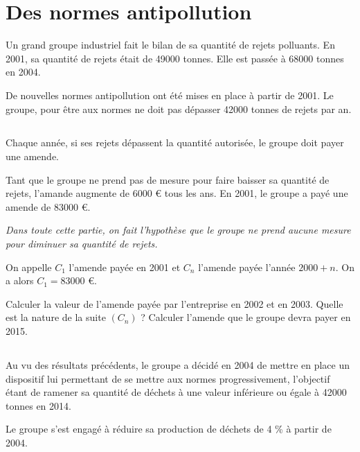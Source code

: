 \section{Des normes antipollution}

Un grand groupe industriel fait le bilan de sa quantité de rejets polluants. En 2001, sa quantité de rejets était de \num{49000} tonnes. Elle est passée à \num{68000} tonnes en 2004.

De nouvelles normes antipollution ont été mises en place à partir de 2001. Le groupe, pour être aux normes ne doit pas dépasser \num{42000} tonnes de rejets par an.

\subsection{}
Chaque année, si ses rejets dépassent la quantité autorisée, le groupe doit payer une amende.

Tant que le groupe ne prend pas de mesure pour faire baisser sa quantité de rejets, l'amande augmente de \num{6000} € tous les ans. En 2001, le groupe a payé une amende de \num{83000} €.

\textit{Dans toute cette partie, on fait l'hypothèse que le groupe ne prend aucune mesure pour diminuer sa quantité de rejets.}

On appelle $C_1$ l'amende payée en 2001 et $C_n$ l'amende payée l'année $2000 + n$. On a alors $C_1 = \num{83000}$ €.

\begin{questions}
	\question Calculer la valeur de l'amende payée par l'entreprise en 2002 et en 2003.
	\question Quelle est la nature de la suite $(C_n)$ ?
	\question Calculer l'amende que le groupe devra payer en 2015.
\end{questions}

\subsection{}

Au vu des résultats précédents, le groupe a décidé en 2004 de mettre en place un dispositif lui permettant de se mettre aux normes progressivement, l'objectif étant de ramener sa quantité de déchets à une valeur inférieure ou égale à \num{42000} tonnes en 2014.

Le groupe s'est engagé à réduire sa production de déchets de 4 \% à partir de 2004.

